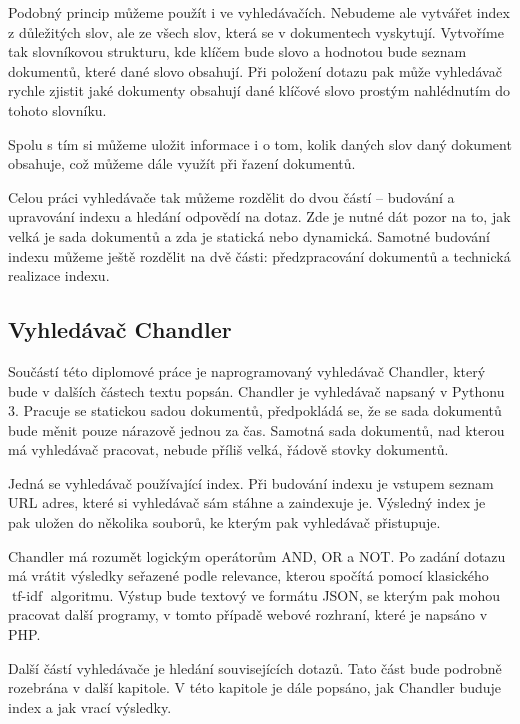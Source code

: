 \documentclass[12pt]{article}
\newcommand{\name}{Chandler}
\DeclareMathOperator{\tfidf}{tf-idf}
\begin{document}
Podobný princip můžeme použít i ve vyhledávačích. Nebudeme ale vytvářet index z důležitých slov, ale ze všech slov, která se v dokumentech vyskytují. Vytvoříme tak slovníkovou strukturu, kde klíčem bude slovo a hodnotou bude seznam dokumentů, které dané slovo obsahují. Při položení dotazu pak může vyhledávač rychle zjistit jaké dokumenty obsahují dané klíčové slovo prostým nahlédnutím do tohoto slovníku. 

Spolu s tím si můžeme uložit informace i o tom, kolik daných slov daný dokument obsahuje, což můžeme dále využít při řazení dokumentů. 

Celou práci vyhledávače tak můžeme rozdělit do dvou částí -- budování a upravování indexu a hledání odpovědí na dotaz. Zde je nutné dát pozor na to, jak velká je sada dokumentů a zda je statická nebo dynamická. Samotné budování indexu můžeme ještě rozdělit na dvě části: předzpracování dokumentů a technická realizace indexu. 

\subsection{Vyhledávač \name}

Součástí této diplomové práce je naprogramovaný vyhledávač \name, který bude v dalších částech textu popsán. \name{} je vyhledávač napsaný v Pythonu 3. Pracuje se statickou sadou dokumentů, předpokládá se, že se sada dokumentů bude měnit pouze nárazově jednou za čas. Samotná sada dokumentů, nad kterou má vyhledávač pracovat, nebude příliš velká, řádově stovky dokumentů. 

Jedná se vyhledávač používající index. Při budování indexu je vstupem seznam URL adres, které si vyhledávač sám stáhne a zaindexuje je. Výsledný index je pak uložen do několika souborů, ke kterým pak vyhledávač přistupuje. 

\name{} má rozumět logickým operátorům AND, OR a NOT. Po zadání dotazu má vrátit výsledky seřazené podle relevance, kterou spočítá pomocí klasického $\tfidf$ algoritmu. Výstup bude textový ve formátu JSON, se kterým pak mohou pracovat další programy, v tomto případě webové rozhraní, které je napsáno v PHP. 

Další částí vyhledávače je hledání souvisejících dotazů. Tato část bude podrobně rozebrána v další kapitole. V této kapitole je dále popsáno, jak \name{} buduje index a jak vrací výsledky. 

\end{document}
